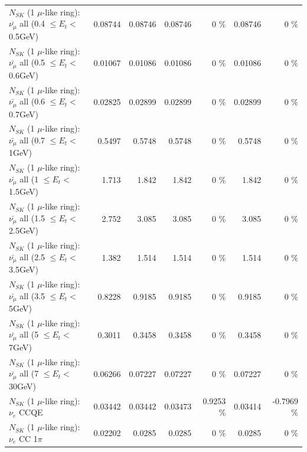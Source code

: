 \begin{table}
\begin{tabular}{| l | r | r | r  r | r  r |}
 $N_{SK}$ (1 $\mu$-like ring): $\bar{\nu_{\mu}}$ all (0.4 $\leq E_{t} <$ 0.5GeV) &         0.08744 &         0.08746 &         0.08746 &        0 \%  &         0.08746 &        0 \%  \\ 
 $N_{SK}$ (1 $\mu$-like ring): $\bar{\nu_{\mu}}$ all (0.5 $\leq E_{t} <$ 0.6GeV) &         0.01067 &         0.01086 &         0.01086 &        0 \%  &         0.01086 &        0 \%  \\ 
 $N_{SK}$ (1 $\mu$-like ring): $\bar{\nu_{\mu}}$ all (0.6 $\leq E_{t} <$ 0.7GeV) &         0.02825 &         0.02899 &         0.02899 &        0 \%  &         0.02899 &        0 \%  \\ 
   $N_{SK}$ (1 $\mu$-like ring): $\bar{\nu_{\mu}}$ all (0.7 $\leq E_{t} <$ 1GeV) &          0.5497 &          0.5748 &          0.5748 &        0 \%  &          0.5748 &        0 \%  \\ 
   $N_{SK}$ (1 $\mu$-like ring): $\bar{\nu_{\mu}}$ all (1 $\leq E_{t} <$ 1.5GeV) &           1.713 &           1.842 &           1.842 &        0 \%  &           1.842 &        0 \%  \\ 
 $N_{SK}$ (1 $\mu$-like ring): $\bar{\nu_{\mu}}$ all (1.5 $\leq E_{t} <$ 2.5GeV) &           2.752 &           3.085 &           3.085 &        0 \%  &           3.085 &        0 \%  \\ 
 $N_{SK}$ (1 $\mu$-like ring): $\bar{\nu_{\mu}}$ all (2.5 $\leq E_{t} <$ 3.5GeV) &           1.382 &           1.514 &           1.514 &        0 \%  &           1.514 &        0 \%  \\ 
   $N_{SK}$ (1 $\mu$-like ring): $\bar{\nu_{\mu}}$ all (3.5 $\leq E_{t} <$ 5GeV) &          0.8228 &          0.9185 &          0.9185 &        0 \%  &          0.9185 &        0 \%  \\ 
     $N_{SK}$ (1 $\mu$-like ring): $\bar{\nu_{\mu}}$ all (5 $\leq E_{t} <$ 7GeV) &          0.3011 &          0.3458 &          0.3458 &        0 \%  &          0.3458 &        0 \%  \\ 
    $N_{SK}$ (1 $\mu$-like ring): $\bar{\nu_{\mu}}$ all (7 $\leq E_{t} <$ 30GeV) &         0.06266 &         0.07227 &         0.07227 &        0 \%  &         0.07227 &        0 \%  \\ 
\hline
\hline
\hline
                                      $N_{SK}$ (1 $\mu$-like ring): $\nu_e$ CCQE &         0.03442 &         0.03442 &         0.03473 &   0.9253 \%  &         0.03414 &  -0.7969 \%  \\ 
                                 $N_{SK}$ (1 $\mu$-like ring): $\nu_e$ CC 1$\pi$ &         0.02202 &          0.0285 &          0.0285 &        0 \%  &          0.0285 &        0 \%  \\ 

\end{tabular}
\end{table}
